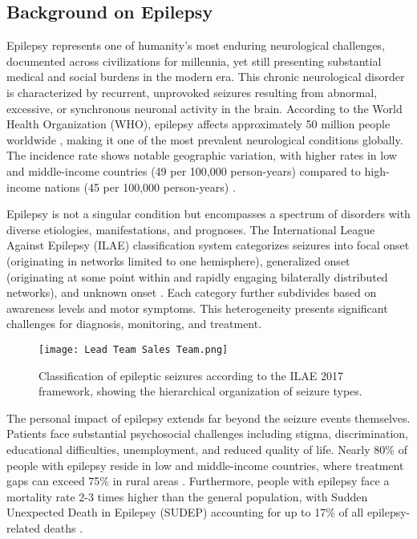 \documentclass[pdflatex,sn-mathphys-num]{sn-jnl}%
\theoremstyle{thmstyleone}%
\theoremstyle{thmstyletwo}%
\theoremstyle{thmstylethree}%
\begin{document}
\subsection{Background on Epilepsy}

Epilepsy represents one of humanity's most enduring neurological challenges, documented across civilizations for millennia, yet still presenting substantial medical and social burdens in the modern era. This chronic neurological disorder is characterized by recurrent, unprovoked seizures resulting from abnormal, excessive, or synchronous neuronal activity in the brain. According to the World Health Organization (WHO), epilepsy affects approximately 50 million people worldwide \citep{WHO2022}, making it one of the most prevalent neurological conditions globally. The incidence rate shows notable geographic variation, with higher rates in low and middle-income countries (49 per 100,000 person-years) compared to high-income nations (45 per 100,000 person-years) \citep{Fiest2017}.

Epilepsy is not a singular condition but encompasses a spectrum of disorders with diverse etiologies, manifestations, and prognoses. The International League Against Epilepsy (ILAE) classification system categorizes seizures into focal onset (originating in networks limited to one hemisphere), generalized onset (originating at some point within and rapidly engaging bilaterally distributed networks), and unknown onset \citep{Fisher2017}. Each category further subdivides based on awareness levels and motor symptoms. This heterogeneity presents significant challenges for diagnosis, monitoring, and treatment.

\begin{figure}[h]
    \centering
    \texttt{[image: Lead Team Sales Team.png]}
    \caption{Classification of epileptic seizures according to the ILAE 2017 framework, showing the hierarchical organization of seizure types.}
    \label{fig:ilae_classification}
\end{figure}

The personal impact of epilepsy extends far beyond the seizure events themselves. Patients face substantial psychosocial challenges including stigma, discrimination, educational difficulties, unemployment, and reduced quality of life. Nearly 80\% of people with epilepsy reside in low and middle-income countries, where treatment gaps can exceed 75\% in rural areas \citep{Meyer2010}. Furthermore, people with epilepsy face a mortality rate 2-3 times higher than the general population, with Sudden Unexpected Death in Epilepsy (SUDEP) accounting for up to 17\% of all epilepsy-related deaths \citep{Devinsky2016}.
\end{document}

